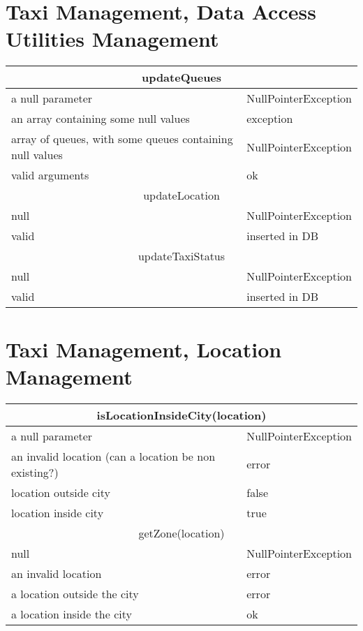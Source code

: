 \documentclass[11pt,oneside,a4paper]{report}
\begin{document}
\section{Taxi Management, Data Access Utilities Management}
\begin{tabular}{p{5cm}|p{6cm}}
	\hline
	\multicolumn{2}{c}{updateQueues}\\\hline
	a null parameter &
	NullPointerException \\\hline
	an array containing some null values &
	exception\\\hline
	array of queues, with some queues containing null values &
	NullPointerException \\\hline
	valid arguments &
	ok \\\hline\hline
	
	\multicolumn{2}{c}{updateLocation}\\\hline
	null &
	NullPointerException \\\hline
	valid &
	inserted in DB \\\hline\hline
	
	\multicolumn{2}{c}{updateTaxiStatus}\\\hline
	null &
	NullPointerException \\\hline
	valid &
	inserted in DB \\\hline
\end{tabular}


\section{Taxi Management, Location Management}
\begin{table}[ph]
\centering
\begin{tabular}{p{5cm}|p{6cm}}
	\hline
	\multicolumn{2}{c}{isLocationInsideCity(location)}\\\hline
	a null parameter &
	NullPointerException \\\hline
	an invalid location (can a location be non existing?)&
	error \\\hline
	location outside city &
	false \\\hline
	location inside city &
	true \\\hline\hline
		
	\multicolumn{2}{c}{getZone(location)}\\\hline
	null &
	NullPointerException \\\hline
	an invalid location &
	error \\\hline
	a location outside the city &
	error \\\hline
	a location inside the city &
	ok \\\hline\hline
	
\end{tabular}
\end{table}
\end{document}
